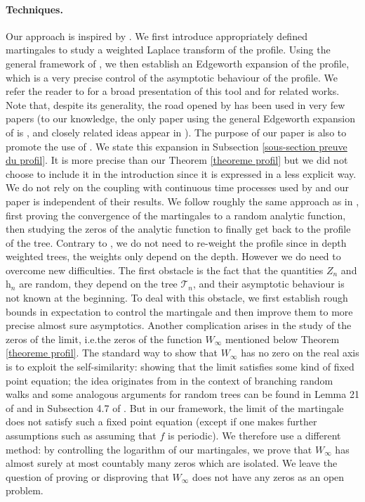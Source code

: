 \documentclass[11pt]{article}
\numberwithin{equation}{section}
\def \T{\mathcal{T}}
\begin{document}
\paragraph{Techniques.} Our approach is inspired by \cite{Sen21}. We first introduce appropriately defined martingales to study a weighted Laplace transform of the profile. Using the general framework of \cite{KMS17}, we then establish an Edgeworth expansion of the profile, which is a very precise control of the asymptotic behaviour of the profile. We refer the reader to \cite{KMS17} for a broad presentation of this tool and for related works. Note that, despite its generality, the road opened by \cite{KMS17} has been used in very few papers (to our knowledge, the only paper using the general Edgeworth expansion of \cite{KMS17} is \cite{Sen21}, and closely related ideas appear in \cite{KKS25}). The purpose of our paper is also to promote the use of \cite{KMS17}. We state this expansion in Subsection \ref{sous-section preuve du profil}. It is more precise than our Theorem \ref{theoreme profil} but we did not choose to include it in the introduction since it is expressed in a less explicit way. We do not rely on the coupling with continuous time processes used by \cite{LMW20, LLLM26} and our paper is independent of their results. We follow roughly the same approach as in \cite{Sen21, KKS25}, first proving the convergence of the martingales to a random analytic function, then studying the zeros of the analytic function to finally get back to the profile of the tree. Contrary to \cite{Sen21}, we do not need to re-weight the profile since in depth weighted trees, the weights only depend on the depth. However we do need to overcome new difficulties. The first obstacle is the fact that the quantities $Z_n$ and $\mathrm{h}_n$ are random, they depend on the tree $\T_n$, and their asymptotic behaviour is not known at the beginning. To deal with this obstacle, we first establish rough bounds in expectation to control the martingale and then improve them to more precise almost sure asymptotics. Another complication arises in the study of the zeros of the limit, i.e.\@ the zeros of the function $W_\infty$ mentioned below Theorem \ref{theoreme profil}. The standard way to show that $W_\infty$ has no zero on the real axis is to exploit the self-similarity: showing that the limit satisfies some kind of fixed point equation; the idea originates from \cite{BG79} in the context of branching random walks and some analogous arguments for random trees can be found in Lemma 21 of \cite{Sen21} and in Subsection 4.7 of \cite{KKS25}. But in our framework, the limit of the martingale does not satisfy such a fixed point equation (except if one makes further assumptions such as assuming that $f$ is periodic). We therefore use a different method: by controlling the logarithm of our martingales, we prove that $W_\infty$ has almost surely at most countably many zeros which are isolated. We leave the question of proving or disproving that $W_\infty$ does not have any zeros as an open problem.
\end{document}
